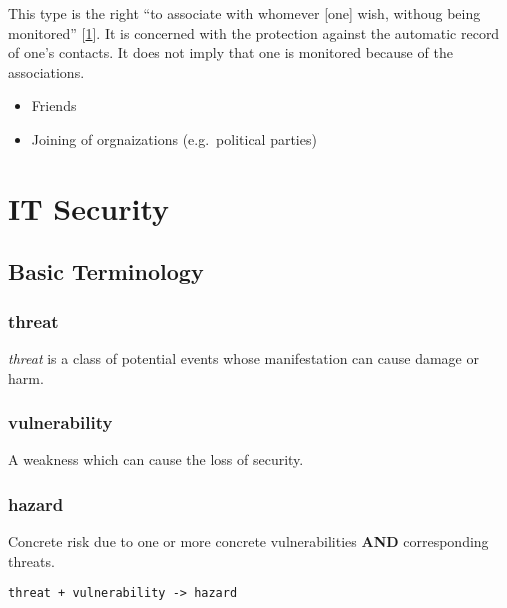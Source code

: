 This type is the right ``to associate with whomever {[}one{]} wish,
withoug being monitored'' {[}\hyperref[references]{1}{]}. It is
concerned with the protection against the automatic record of one's
contacts. It does not imply that one is monitored because of the
associations.

\begin{itemize}
\itemsep1pt\parskip0pt
\item
  Friends
\item
  Joining of orgnaizations (e.g.~political parties)
\end{itemize}



\section{IT Security}

\subsection{Basic Terminology}



\subsubsection{threat}

\emph{threat} is a class of potential events whose manifestation can
cause damage or harm.

\subsubsection{vulnerability}

A weakness which can cause the loss of security.

\subsubsection{hazard}

Concrete risk due to one or more concrete vulnerabilities \textbf{AND}
corresponding threats.

\texttt{threat + vulnerability -\textgreater{} hazard}

